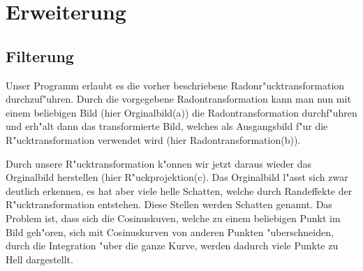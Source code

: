 \section{Erweiterung}

\subsection{Filterung}


Unser Programm erlaubt es die vorher beschriebene Radonr"ucktransformation
durchzuf"uhren. Durch die vorgegebene Radontransformation kann man nun
mit einem beliebigen Bild (hier Orginalbild(a)) die Radontransformation
durchf"uhren und erh"alt dann das transformierte Bild, welches
als Ausgangsbild f"ur die R"ucktransformation verwendet wird (hier
Radontransformation(b)).

\begin{figure}[ht!]\centering
\end{figure}

Durch unsere R"ucktransformation k"onnen wir jetzt daraus wieder das
Orginalbild herstellen (hier R"uckprojektion(c). Das Orginalbild l"asst
sich zwar deutlich erkennen, es hat aber viele helle Schatten, welche
durch Randeffekte der R"ucktransformation entstehen. Diese Stellen werden
Schatten genannt. Das Problem ist, dass sich die Cosinuskuven, welche
zu einem beliebigen Punkt im Bild geh"oren, sich mit Cosinuskurven von
anderen Punkten "uberschneiden, durch die Integration "uber die ganze
Kurve, werden dadurch viele Punkte zu Hell dargestellt.

